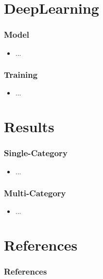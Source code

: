 \documentclass[compress,aspectratio=169]{beamer} %
\begin{document}
\section{DeepLearning}

\begin{frame}[fragile]
	\frametitle{Model}
	\begin{itemize}
		\item ...
	\end{itemize}
\end{frame}

\begin{frame}[fragile]
	\frametitle{Training}
	\begin{itemize}
		\item ...
	\end{itemize}
\end{frame}

\section{Results}

\begin{frame}[fragile]
	\frametitle{Single-Category}
	\begin{itemize}
		\item ...
	\end{itemize}
\end{frame}

\begin{frame}[fragile]
	\frametitle{Multi-Category}
	\begin{itemize}
		\item ...
	\end{itemize}
\end{frame}


\section*{References}

\begin{frame}[t]%
	\frametitle{References}

	\tiny%
	
	
\end{frame}
\end{document}
